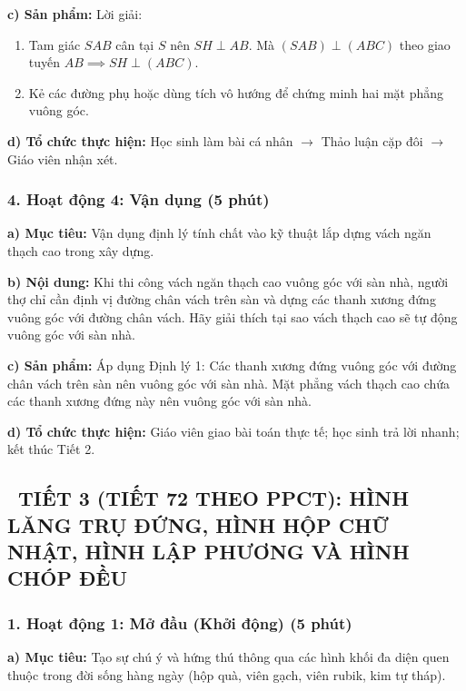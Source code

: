 \documentclass[12pt, a4paper]{article}
\begin{document}
\noindent \textbf{c) Sản phẩm:}
Lời giải:
\begin{enumerate}[leftmargin=0.6cm]
    \item Tam giác $SAB$ cân tại $S$ nên $SH \perp AB$. Mà $(SAB) \perp (ABC)$ theo giao tuyến $AB \implies SH \perp (ABC)$.
    \item Kẻ các đường phụ hoặc dùng tích vô hướng để chứng minh hai mặt phẳng vuông góc.
\end{enumerate}

\noindent \textbf{d) Tổ chức thực hiện:}
Học sinh làm bài cá nhân $\to$ Thảo luận cặp đôi $\to$ Giáo viên nhận xét.

\subsubsection*{4. Hoạt động 4: Vận dụng (5 phút)}

\noindent \textbf{a) Mục tiêu:}
Vận dụng định lý tính chất vào kỹ thuật lắp dựng vách ngăn thạch cao trong xây dựng.

\noindent \textbf{b) Nội dung:}
Khi thi công vách ngăn thạch cao vuông góc với sàn nhà, người thợ chỉ cần định vị đường chân vách trên sàn và dựng các thanh xương đứng vuông góc với đường chân vách. Hãy giải thích tại sao vách thạch cao sẽ tự động vuông góc với sàn nhà.

\noindent \textbf{c) Sản phẩm:}
Áp dụng Định lý 1: Các thanh xương đứng vuông góc với đường chân vách trên sàn nên vuông góc với sàn nhà. Mặt phẳng vách thạch cao chứa các thanh xương đứng này nên vuông góc với sàn nhà.

\noindent \textbf{d) Tổ chức thực hiện:}
Giáo viên giao bài toán thực tế; học sinh trả lời nhanh; kết thúc Tiết 2.

\vspace{10pt}

\subsection*{\faClockO \ TIẾT 3 (TIẾT 72 THEO PPCT): HÌNH LĂNG TRỤ ĐỨNG, HÌNH HỘP CHỮ NHẬT, HÌNH LẬP PHƯƠNG VÀ HÌNH CHÓP ĐỀU}

\subsubsection*{1. Hoạt động 1: Mở đầu (Khởi động) (5 phút)}

\noindent \textbf{a) Mục tiêu:}
Tạo sự chú ý và hứng thú thông qua các hình khối đa diện quen thuộc trong đời sống hàng ngày (hộp quà, viên gạch, viên rubik, kim tự tháp).
\end{document}
